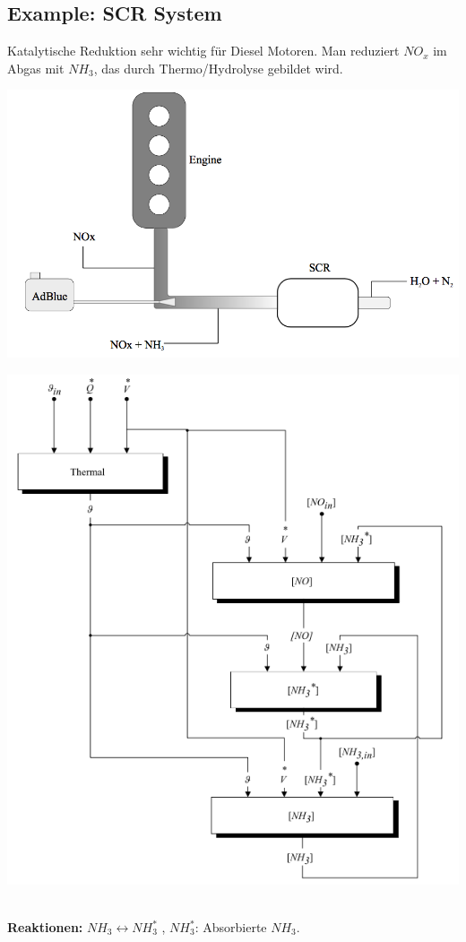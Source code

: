 \documentclass[10pt,a4paper]{scrartcl}
\begin{document}
\begin{multicols*}{3}
\subsection{Example: SCR System}
Katalytische Reduktion sehr wichtig f\"ur Diesel Motoren. Man reduziert $NO_x$ im Abgas mit $NH_3$, das durch Thermo/Hydrolyse gebildet wird. \\
\begin{minipage}{0.4\columnwidth}
		\begin{center}\includegraphics[width=\columnwidth]{scr_1.png}\end{center}
           \end{minipage} 
 \begin{minipage}{0.6\columnwidth}
		\begin{center}\includegraphics[width=0.5\columnwidth]{scr_2.png}\end{center}
           \end{minipage} \\
\textbf{Reaktionen:} $NH_3\leftrightarrow NH_3^*$ , $NH_3^*$: Absorbierte $NH_3$.\\

\end{multicols*}
\end{document}
